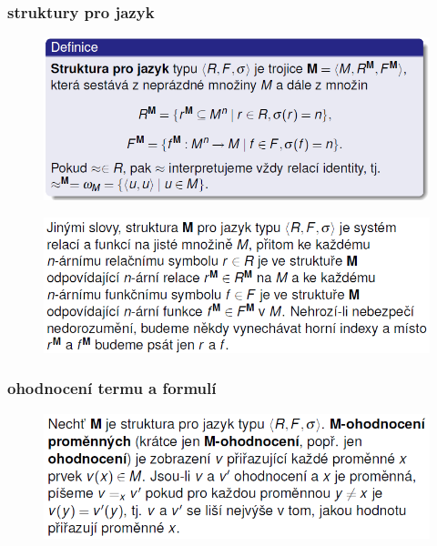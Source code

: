 \documentclass[10pt,a4paper]{article}
\theoremstyle{note}
\begin{document}
		\subsubsection{struktury pro jazyk}

			\begin{figure}[H]
			\centering
			\includegraphics[width=13cm]{img/stukturaProJazyk.png}
			\end{figure}

			\begin{figure}[H]
			\centering
			\includegraphics[width=13cm]{img/strukturaProJazyk.png}
			\end{figure}

		\subsubsection{ohodnocení termu a formulí}

			\begin{figure}[H]
			\centering
			\includegraphics[width=13cm]{img/ohodnoceniPL.png}
			\end{figure}
\end{document}
